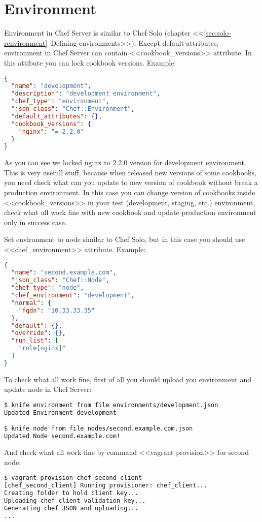 \section{Environment}

Environment in Chef Server is similar to Chef Solo (chapter <<\ref{sec:solo-renvironment}~Defining environments>>). Except default attributes, environment in Chef Server can contain <<cookbook\_versions>> attribute. In this attibute you can lock cookbook versions. Example:

\begin{lstlisting}[language=JSON,label=lst:my-serer-cloud-environment1,title=my-server-cloud/environments/development.json]
{
  "name": "development",
  "description": "development environment",
  "chef_type": "environment",
  "json_class": "Chef::Environment",
  "default_attributes": {},
  "cookbook_versions": {
    "nginx": "= 2.2.0"
  }
}
\end{lstlisting}

As you can see we locked nginx to 2.2.0 version for development environment. This is very usefull stuff, because when released new versions of some cookbooks, you need check what can you update to new version of cookbook without break a production environment. In this case you can change version of cookbooks inside <<cookbook\_versions>> in your test (development, staging, etc.) environment, check what all work fine with new cookbook and update production environment only in success case.

Set environment to node similar to Chef Solo, but in this case you should use <<chef\_environment>> attribute. Example:

\begin{lstlisting}[language=JSON,label=lst:my-serer-cloud-environment2,title=my-server-cloud/nodes/second.example.com.json]
{
  "name": "second.example.com",
  "json_class": "Chef::Node",
  "chef_type": "node",
  "chef_environment": "development",
  "normal": {
    "fqdn": "10.33.33.35"
  },
  "default": {},
  "override": {},
  "run_list": [
    "role[nginx]"
  ]
}
\end{lstlisting}

To check what all work fine, first of all you should upload you environment and update node in Chef Server:

\begin{lstlisting}[language=Bash,label=lst:my-serer-cloud-environment3]
$ knife environment from file environments/development.json
Updated Environment development

$ knife node from file nodes/second.example.com.json
Updated Node second.example.com!
\end{lstlisting}

And check what all work fine by command <<vagrant provision>> for second node:

\begin{lstlisting}[language=Bash,label=lst:my-serer-cloud-environment4]
$ vagrant provision chef_second_client
[chef_second_client] Running provisioner: chef_client...
Creating folder to hold client key...
Uploading chef client validation key...
Generating chef JSON and uploading...
...
\end{lstlisting}
